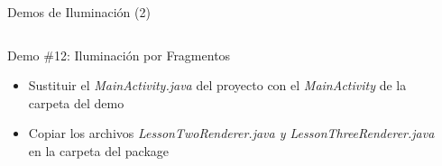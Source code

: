 \documentclass[aspectratio=169,compress]{beamer}
\begin{document}
\begin{frame}{Demos de Iluminación (2)}
\begin{columns}
\begin{column}{0.7\textwidth}
\begin{block}{Demo \#12: Iluminación por Fragmentos}
\begin{itemize}
\item Sustituir el \textit{MainActivity.java} del proyecto con el \textit{MainActivity} de la carpeta del demo
\item Copiar los archivos \textit{LessonTwoRenderer.java y LessonThreeRenderer.java} en la carpeta del package
\end{itemize}
\end{block}
\end{column}
\begin{column}{0.3\textwidth}
\begin{center}

\end{center}
\end{column}
\end{columns}
\end{frame}
\end{document}
